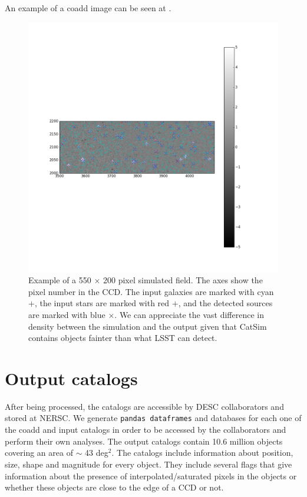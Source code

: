 \documentclass[\docopts]{\docclass}
\begin{document}
An example of a coadd image can be seen at .

\begin{figure}
\centering
\includegraphics[trim={3cm, 14cm, 12cm, 12cm},clip,width=0.9\columnwidth]{field.png}
\caption{Example of a 550 $\times$ 200 pixel simulated field. The axes show the pixel number in the CCD. The input galaxies are marked with cyan $+$, the input stars are marked with red $+$, and the detected sources are marked with blue $\times$. We can appreciate the vast difference in density between the simulation and the output given that CatSim contains objects fainter than what LSST can detect.}
\label{fig:coadd_example}
\end{figure}

\section{Output catalogs}
\label{sec:catalogs}

After being processed, the catalogs are accessible by DESC collaborators and stored at NERSC. We generate \texttt{pandas
dataframes} and databases for each one of the coadd and input catalogs in order to be accessed by the collaborators and perform their own analyses. The output catalogs contain 10.6 million objects covering an area
of $\sim$ 43 deg$^{2}$. The catalogs include information about position, size, shape and magnitude for every object. They include several flags that give information about the presence of interpolated/saturated pixels in the objects or whether these objects are close to the edge of a CCD or not.
\end{document}
